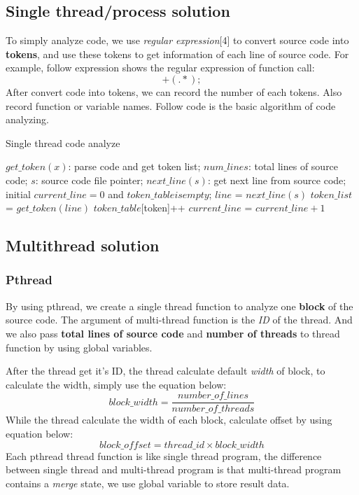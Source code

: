 \documentclass{acm_proc_article-sp}
\begin{document}
\subsection{Single thread/process solution}
	To simply analyze code, we use \textit{regular expression}[4] to convert source
	code into \textbf{tokens}, and use these tokens to get information of each line
	of source code. For example, follow expression shows the regular expression of function call: 
	\begin{displaymath}
		[a-zA-Z_][a-zA-Z0-9_]+(.*);
	\end{displaymath}
	After convert code into tokens, we can record the number of each tokens. Also
	record function or variable names.
	Follow code is the basic algorithm of code analyzing.
	\begin{algorithm}[h]
		\caption{Single thread code analyze}
		\begin{algorithmic}[1]
			\Require
				$get\_token(x)$: parse code and get token list;
				$num\_lines$: total lines of source code;
				$s$: source code file pointer;
				$next\_line(s)$: get next line from source code;
			\State initial $current\_line=0$ and $token\_table is empty$;
				\State $line$ = $next\_line(s)$
				\State $token\_list$ = $get\_token(line)$
					\State $token\_table[$token]++
				\EndFor
				\State $current\_line$ = $current\_line + 1$
			\EndWhile
		\end{algorithmic}
	\end{algorithm}

\subsection{Multithread solution}
\subsubsection{Pthread}
	By using pthread, we create a single thread function to analyze one \textbf{block}
	of the source code. The argument of multi-thread function is the \textit{ID} of the thread.
	And we also pass \textbf{total lines of source code} and \textbf{number of threads} to
	thread function by using global variables.

	After the thread get it's ID, the thread calculate default \textit{width} of block, to calculate
	the width, simply use the equation below:
	\begin{displaymath}
	block\_width = \frac{number\_of\_lines}{number\_of\_threads}
	\end{displaymath}
	While the thread calculate the width of each block, calculate offset by using equation below:
	\begin{displaymath}
	block\_offset = thread\_id \times block\_width
	\end{displaymath}
	Each pthread thread function is like single thread program, the difference between single thread
	and multi-thread program is that multi-thread program contains a \textit{merge} state, we use
	global variable to store result data.
\end{document}
